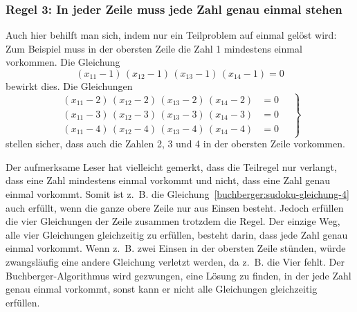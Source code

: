 \subsubsection{Regel 3: In jeder Zeile muss jede Zahl genau einmal stehen}
Auch hier behilft man sich, indem nur ein Teilproblem auf einmal gelöst wird:
Zum Beispiel muss in der obersten Zeile die Zahl 1 mindestens einmal vorkommen.
Die Gleichung
\begin{equation}
  (x_{11} - 1)\,(x_{12} - 1)\,(x_{13} - 1)\,(x_{14} - 1) = 0
  \label{buchberger:sudoku-gleichung-4}
\end{equation}
bewirkt dies.
%
Die Gleichungen
\begin{equation}
\left.
  \begin{aligned}
  (x_{11} - 2)\,(x_{12} - 2)\,(x_{13} - 2)\,(x_{14} - 2) &= 0 \\
  (x_{11} - 3)\,(x_{12} - 3)\,(x_{13} - 3)\,(x_{14} - 3) &= 0 \\
  (x_{11} - 4)\,(x_{12} - 4)\,(x_{13} - 4)\,(x_{14} - 4) &= 0
  \end{aligned}
\quad %
\right\}
\label{buchberger:sudoku-gleichung-5}
\end{equation}
stellen sicher, dass auch die Zahlen 2, 3 und 4 in der obersten Zeile vorkommen.

Der aufmerksame Leser hat vielleicht gemerkt, dass die Teilregel nur verlangt, dass eine Zahl mindestens einmal vorkommt und nicht, dass eine Zahl genau einmal vorkommt.
Somit ist z.~B. die Gleichung~\eqref{buchberger:sudoku-gleichung-4} auch erfüllt, wenn die ganze obere Zeile nur aus Einsen besteht.
Jedoch erfüllen die vier Gleichungen der Zeile zusammen trotzdem die Regel.
Der einzige Weg, alle vier Gleichungen gleichzeitig zu erfüllen, besteht darin, dass jede Zahl genau einmal vorkommt.
Wenn z.~B. zwei Einsen in der obersten Zeile stünden, würde zwangsläufig eine andere Gleichung verletzt werden, da z.~B. die Vier fehlt.
Der Buchberger-Algorithmus wird gezwungen, eine Lösung zu finden, in der jede Zahl genau einmal vorkommt, sonst kann er nicht alle Gleichungen gleichzeitig erfüllen.

